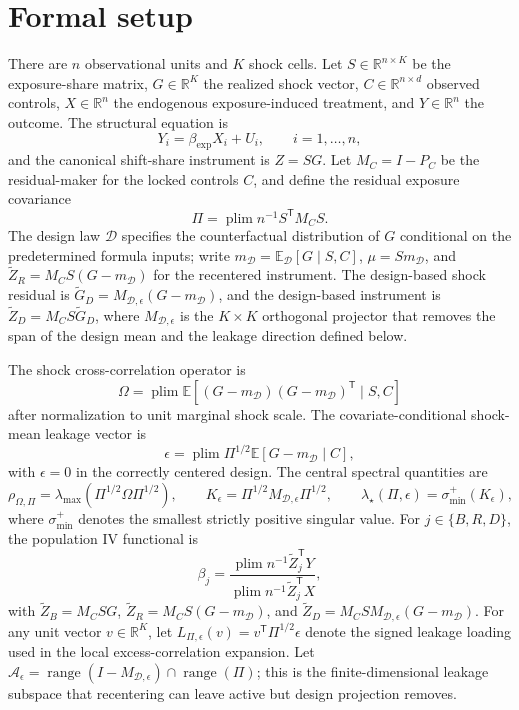 \documentclass[11pt]{article}
\newcommand{\E}{\mathbb{E}}
\newcommand{\transpose}{\mathsf{T}}
\newcommand{\R}{\mathbb{R}}
\newcommand{\plim}{\operatorname*{plim}}
\theoremstyle{definition}
\theoremstyle{plain}
\theoremstyle{remark}
\begin{document}
\section{Formal setup}
There are $n$ observational units and $K$ shock cells.  Let $S\in\R^{n\times K}$ be the exposure-share matrix, $G\in\R^K$ the realized shock vector, $C\in\R^{n\times d}$ observed controls, $X\in\R^n$ the endogenous exposure-induced treatment, and $Y\in\R^n$ the outcome.  The structural equation is
\[
Y_i=\beta_{\exp}X_i+U_i,\qquad i=1,\ldots,n,
\]
and the canonical shift-share instrument is $Z=SG$.  Let $M_C=I-P_C$ be the residual-maker for the locked controls $C$, and define the residual exposure covariance
\[
\Pi=\plim n^{-1}S^\transpose M_C S.
\]
The design law $\mathcal{D}$ specifies the counterfactual distribution of $G$ conditional on the predetermined formula inputs; write $m_{\mathcal{D}}=\E_{\mathcal{D}}[G\mid S,C]$, $\mu=S m_{\mathcal{D}}$, and $\widetilde Z_R=M_C S(G-m_{\mathcal{D}})$ for the recentered instrument.  The design-based shock residual is $\widetilde G_D=M_{\mathcal{D},\epsilon}(G-m_{\mathcal{D}})$, and the design-based instrument is $\widetilde Z_D=M_C S\widetilde G_D$, where $M_{\mathcal{D},\epsilon}$ is the $K\times K$ orthogonal projector that removes the span of the design mean and the leakage direction defined below.

The shock cross-correlation operator is
\[
\Omega=\plim \E[(G-m_{\mathcal{D}})(G-m_{\mathcal{D}})^\transpose\mid S,C]
\]
after normalization to unit marginal shock scale.  The covariate-conditional shock-mean leakage vector is
\[
\epsilon=\plim \Pi^{1/2}\E[G-m_{\mathcal{D}}\mid C],
\]
with $\epsilon=0$ in the correctly centered design.  The central spectral quantities are
\[
\rho_{\Omega,\Pi}=\lambda_{\max}(\Pi^{1/2}\Omega\Pi^{1/2}),\qquad
K_\epsilon=\Pi^{1/2}M_{\mathcal{D},\epsilon}\Pi^{1/2},\qquad
\lambda_\star(\Pi,\epsilon)=\sigma_{\min}^{+}(K_\epsilon),
\]
where $\sigma_{\min}^{+}$ denotes the smallest strictly positive singular value.  For $j\in\{B,R,D\}$, the population IV functional is
\[
\beta_j=\frac{\plim n^{-1}\widetilde Z_j^\transpose Y}{\plim n^{-1}\widetilde Z_j^\transpose X},
\]
with $\widetilde Z_B=M_CSG$, $\widetilde Z_R=M_C S(G-m_{\mathcal{D}})$, and $\widetilde Z_D=M_CSM_{\mathcal{D},\epsilon}(G-m_{\mathcal{D}})$.  For any unit vector $v\in\R^K$, let $L_{\Pi,\epsilon}(v)=v^\transpose \Pi^{1/2}\epsilon$ denote the signed leakage loading used in the local excess-correlation expansion.
Let $\mathcal A_\epsilon=\operatorname{range}(I-M_{\mathcal{D},\epsilon})\cap\operatorname{range}(\Pi)$; this is the finite-dimensional leakage subspace that recentering can leave active but design projection removes.
\end{document}
